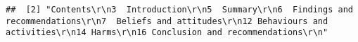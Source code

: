 \documentclass[
]{book}
\begin{document}
\begin{verbatim}
##  [2] "Contents\r\n3  Introduction\r\n5  Summary\r\n6  Findings and recommendations\r\n7  Beliefs and attitudes\r\n12 Behaviours and activities\r\n14 Harms\r\n16 Conclusion and recommendations\r\n"                                                                                                                                                                                                                                                                                                                                                                                                                                                                                                                                                                                                                                                                                                                                                                                                                                                                                                                                                                                                                                                                                                                                                                                                                                                                                                                                                                                                                                                                                                                                                                                                                                                                                                                                                                                                                                                                                                                                                                                                                                                                                                                                                                                                                                                                                                                                                                                                                                                                                                                                                                                                                                                                                                                                                                                                                                                                                                                                                                                                                                                                                                                                                                                                                                                
\end{verbatim}
\end{document}
